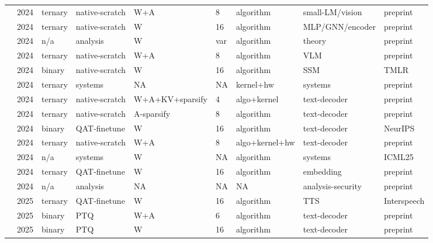 \documentclass[11pt]{article}
\begin{document}
\begin{landscape}
\begin{longtable}{p{3.2cm} p{1cm} p{1.9cm} p{2.2cm} p{2.2cm} p{1.3cm} p{2.2cm} p{2.1cm} p{2.5cm}}
\citet{Nielsen2024-Reloaded} & 2024 & ternary & native-scratch & W+\allowbreak{}A & 8 & algorithm & small-LM/\allowbreak{}vision & preprint \\
\citet{Nielsen2024-WhenEnough} & 2024 & ternary & native-scratch & W & 16 & algorithm & MLP/\allowbreak{}GNN/\allowbreak{}encoder & preprint \\
\citet{Ouyang2024-QiDScaling} & 2024 & n/\allowbreak{}a & analysis & W & var & algorithm & theory & preprint \\
\citet{Sundaram2024-LLaVaOLMoBitnet} & 2024 & ternary & native-scratch & W+\allowbreak{}A & 8 & algorithm & VLM & preprint \\
\citet{Tang2024-BiMamba} & 2024 & binary & native-scratch & W & 16 & algorithm & SSM & TMLR \\
\citet{Wang2024-1bitAIInfra} & 2024 & ternary & systems & NA & NA & kernel+\allowbreak{}hw & systems & preprint \\
\citet{Wang2024-BitNetA48} & 2024 & ternary & native-scratch & W+\allowbreak{}A+\allowbreak{}KV+\allowbreak{}sparsify & 4 & algo+\allowbreak{}kernel & text-decoder & preprint \\
\citet{Wang2024-QSparse} & 2024 & ternary & native-scratch & A-sparsify & 8 & algorithm & text-decoder & preprint \\
\citet{Xu2024-OneBit} & 2024 & binary & QAT-finetune & W & 16 & algorithm & text-decoder & Neur\allowbreak{}IPS \\
\citet{Zhu2024-MatmulFree} & 2024 & ternary & native-scratch & W+\allowbreak{}A & 8 & algo+\allowbreak{}kernel+\allowbreak{}hw & text-decoder & preprint \\
\citet{Dehghankar2024-EfficientMatmul} & 2024 & n/\allowbreak{}a & systems & W & NA & algorithm & systems & ICML25 \\
\citet{Chen2024-TernaryEmbedding} & 2024 & ternary & QAT-finetune & W & 16 & algorithm & embedding & preprint \\
\citet{Fan2024-ResilientEfficient} & 2024 & n/\allowbreak{}a & analysis & NA & NA & NA & analysis-security & preprint \\
\citet{Kawamura2025-BitTTS} & 2025 & ternary & QAT-finetune & W & 16 & algorithm & TTS & Interspeech \\
\citet{Ye2025-DBellQuant} & 2025 & binary & PTQ & W+\allowbreak{}A & 6 & algorithm & text-decoder & preprint \\
\citet{Hoang2025-OutputAlign1bit} & 2025 & binary & PTQ & W & 16 & algorithm & text-decoder & preprint \\

\end{longtable}
\end{landscape}
\end{document}
